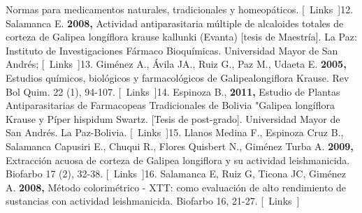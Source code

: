 \documentclass{article}
\begin{document}
{Normas para medicamentos naturales, tradicionales y homeopáticos.    [ Links ]}{12. Salamanca E. \textbf{2008, }
Actividad antiparasitaria múltiple de alcaloides totales de corteza de Galipea longíflora krause kallunki (Evanta) [tesis de Maestría]. La Paz: Instituto de Investigaciones Fármaco Bioquímicas. Universidad Mayor de San Andrés;    [ Links ]}{13. Giménez A., Ávila JA., Ruiz G., Paz M., Udaeta E. \textbf{2005, }
Estudios químicos, biológicos y farmacológicos de Galipealongiflora Krause. Rev Bol Quim. 22 (1), 94-107.    [ Links ]}{14. Espinoza B., \textbf{2011, }
Estudio de Plantas Antiparasitarias de Farmacopeas Tradicionales de Bolivia "Galipea longíflora Krause y Píper hispidum Swartz. [Tesis de post-grado]. Universidad Mayor de San Andrés. La Paz-Bolivia.    [ Links ]}{15. Llanos Medina F., Espinoza Cruz B., Salamanca Capusiri E., Chuqui R., Flores Quisbert N., Giménez Turba A. \textbf{2009, }
Extracción acuosa de corteza de Galipea longiflora y su actividad leishmanicida. Biofarbo 17 (2), 32-38.    [ Links ]}{16. Salamanca E, Ruiz G, Ticona JC, Giménez A. \textbf{2008, }
Método colorimétrico - XTT: como evaluación de alto rendimiento de sustancias con actividad leishmanicida. Biofarbo 16, 21-27.    [ Links ]}
\end{document}
